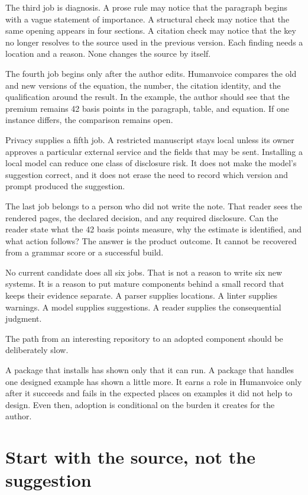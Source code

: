The third job is diagnosis. A prose rule may notice that the paragraph begins
with a vague statement of importance. A structural check may notice that the
same opening appears in four sections. A citation check may notice that the key
no longer resolves to the source used in the previous version. Each finding
needs a location and a reason. None changes the source by itself.

The fourth job begins only after the author edits. Humanvoice compares the old
and new versions of the equation, the number, the citation identity, and the
qualification around the result. In the example, the author should see that the
premium remains 42 basis points in the paragraph, table, and equation. If one
instance differs, the comparison remains open.

Privacy supplies a fifth job. A restricted manuscript stays local unless its
owner approves a particular external service and the fields that may be sent.
Installing a local model can reduce one class of disclosure risk. It does not
make the model's suggestion correct, and it does not erase the need to record
which version and prompt produced the suggestion.

The last job belongs to a person who did not write the note. That reader sees
the rendered pages, the declared decision, and any required disclosure. Can the
reader state what the 42 basis points measure, why the estimate is identified,
and what action follows? The answer is the product outcome. It cannot be
recovered from a grammar score or a successful build.

No current candidate does all six jobs. That is not a reason to write six new
systems. It is a reason to put mature components behind a small record that
keeps their evidence separate. A parser supplies locations. A linter supplies
warnings. A model supplies suggestions. A reader supplies the consequential
judgment.

The path from an interesting repository to an adopted component should be
deliberately slow.

\hvFigurePackageFunnel

A package that installs has shown only that it can run. A package that handles
one designed example has shown a little more. It earns a role in Humanvoice
only after it succeeds and fails in the expected places on examples it did not
help to design. Even then, adoption is conditional on the burden it creates for
the author.

\section{Start with the source, not the suggestion}
\label{sec:component-source}

